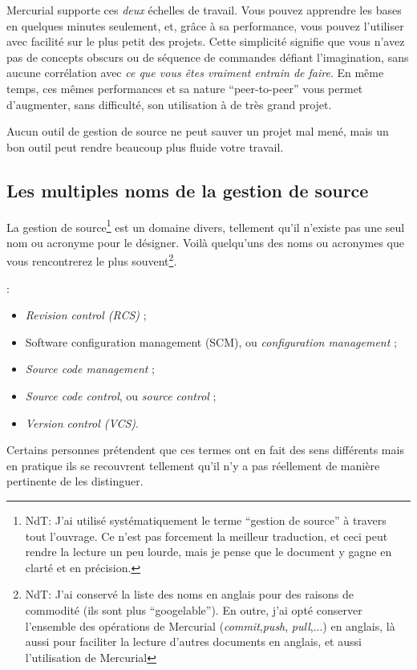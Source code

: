 Mercurial supporte ces \emph{deux} échelles de travail. Vous pouvez apprendre
les bases en quelques minutes seulement, et, grâce à sa performance, vous pouvez
l'utiliser avec facilité sur le plus petit des projets. Cette simplicité 
signifie que vous n'avez pas de concepts obscurs ou de séquence de commandes
défiant l'imagination, sans aucune corrélation avec \emph{ce que vous êtes 
vraiment entrain de faire}. En même temps, ces mêmes performances et sa 
nature ``peer-to-peer'' vous permet d'augmenter, sans difficulté, son 
utilisation à de très grand projet.

Aucun outil de gestion de source ne peut sauver un projet mal mené, mais un
bon outil peut rendre beaucoup plus fluide votre travail.

\subsection{Les multiples noms de la gestion de source}

La gestion de source\footnote{NdT: J'ai utilisé systématiquement le terme
``gestion de source'' à travers tout l'ouvrage. Ce n'est pas forcement la
meilleur traduction, et ceci peut rendre la lecture un peu lourde, mais je
pense que le document y gagne en clarté et en précision.} est un domaine
divers, tellement qu'il n'existe pas une seul nom ou acronyme pour le désigner.
Voilà quelqu'uns des noms ou 
acronymes que vous rencontrerez le plus souvent\footnote{NdT: J'ai conservé la
liste des noms en anglais pour des raisons de commodité (ils sont plus
``googelable''). En outre, j'ai opté  conserver l'ensemble des opérations de
Mercurial (\textit{commit},\textit{push}, \textit{pull},...) en anglais, là
aussi pour faciliter la lecture d'autres documents en anglais, et aussi
l'utilisation de Mercurial}.

:
\begin{itemize}
\item \textit{Revision control (RCS)} ;
\item Software configuration management (SCM), ou \textit{configuration management} ;
\item \textit{Source code management} ;
\item \textit{Source code control}, ou \textit{source control} ;
\item \textit{Version control (VCS)}.
\end{itemize}

Certains personnes prétendent que ces termes ont en fait des sens
différents mais en pratique ils se recouvrent tellement qu'il n'y a pas
réellement de manière pertinente de les distinguer.

